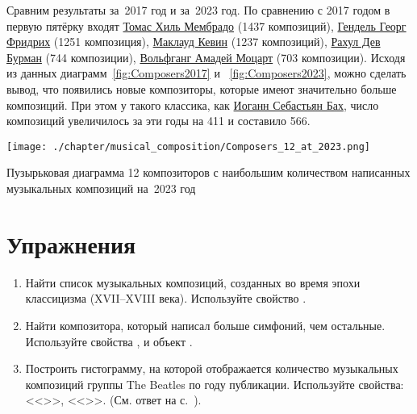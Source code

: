 Сравним результаты за~2017 год и за~2023 год.
По сравнению с 2017 годом в первую пятёрку входят 
\href{https://ca.wikipedia.org/wiki/Tomàs_Gil_i_Membrado}{Томас Хиль Мембрадо} 
(\num{1437} композиций), 
\href{https://ru.wikipedia.org/wiki/Гендель,_Георг_Фридрих}{Гендель Георг Фридрих} (\num{1251} композиция), 
\href{https://ru.wikipedia.org/wiki/Маклауд,_Кевин}{Маклауд Кевин} (\num{1237} композиций), 
\href{https://en.wikipedia.org/wiki/R._D._Burman}{Рахул Дев Бурман} (\num{744} композиции), 
\href{https://ru.wikipedia.org/wiki/Моцарт,_Вольфганг_Амадей}{Вольфганг Амадей Моцарт} (\num{703} композиции). 
Исходя из данных диаграмм~\ref{fig:Composers2017} и ~\ref{fig:Composers2023}, 
можно сделать вывод, что появились новые композиторы, 
которые имеют значительно больше композиций. 
При этом у такого классика, как 
\href{https://ru.wikipedia.org/?curid=17950}{Иоганн Себастьян Бах}, 
число композиций увеличилось за эти годы на 411 и составило 566. 


\newpage
\begin{marginfigure}
  \texttt{[image: ./chapter/musical\_composition/Composers\_12\_at\_2023.png]}
  \caption[Диаграмма 12 композиторов с наибольшим количеством написанных музыкальных композиций на~2023 год]
          {Пузырьковая диаграмма 12 композиторов с наибольшим количеством написанных музыкальных композиций на~2023 год}%
  \label{fig:12composers}%
\end{marginfigure}


\section{Упражнения}
\begin{enumerate}
\item Найти список музыкальных композиций, созданных во время эпохи классицизма (XVII--XVIII века).
Используйте свойство .
\item Найти композитора, который написал больше симфоний, чем остальные. 
    Используйте свойства , 
        и объект .
\item Построить гистограмму, на которой отображается количество музыкальных композиций 
        группы The Beatles по году публикации.
        Используйте свойства: <<>>, <<>>. 
%        
        \label{question:TheBeatles_quest}
        (См. ответ %
         на с.~\pageref{answer:TheBeatles_answ}).
\end{enumerate}

